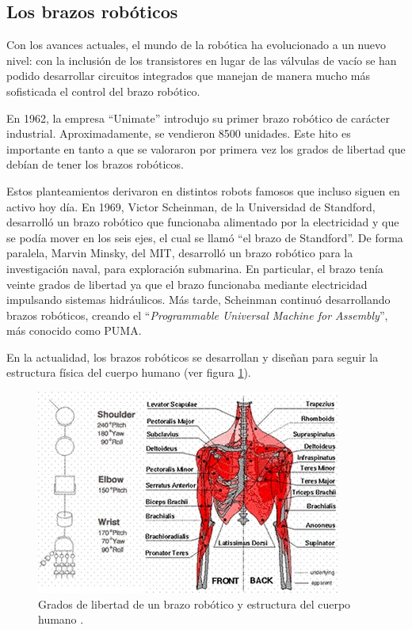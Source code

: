 \subsection{Los brazos robóticos}

Con los avances actuales, el mundo de la robótica ha evolucionado a un nuevo nivel: con la inclusión
de los transistores en lugar de las válvulas de vacío se han podido desarrollar circuitos integrados
que manejan de manera mucho más sofisticada el control del brazo robótico.

En 1962, la empresa ``Unimate'' introdujo su primer brazo robótico de carácter industrial. Aproximadamente,
se vendieron 8500 unidades. Este hito es importante en tanto a que se valoraron por primera vez los
grados de libertad que debían de tener los brazos robóticos. 

Estos planteamientos derivaron en distintos robots famosos que incluso siguen en activo hoy día. En
1969, Victor Scheinman, de la Universidad de Standford, desarrolló un brazo robótico que funcionaba
alimentado por la electricidad y que se podía mover en los seis ejes, el cual se llamó ``el brazo de
Standford''. De forma paralela, Marvin Minsky, del MIT, desarrolló un brazo robótico para la investigación
naval, para exploración submarina. En particular, el brazo tenía veinte grados de libertad ya que el brazo
funcionaba mediante electricidad impulsando sistemas hidráulicos. Más tarde, Scheinman continuó
desarrollando brazos robóticos, creando el ``\textit{Programmable Universal Machine for Assembly}'',
más conocido como PUMA.

En la actualidad, los brazos robóticos se desarrollan y diseñan para seguir la estructura física
del cuerpo humano (ver figura \ref{fig:human_body}).

\begin{figure}[H]
    \centering
    \includegraphics[width=.65\linewidth]{pictures/human_body.png}
    \caption{Grados de libertad de un brazo robótico y estructura del cuerpo humano \cite{moranEvolutionRoboticArms2007a}.}
    \label{fig:human_body}
\end{figure}

